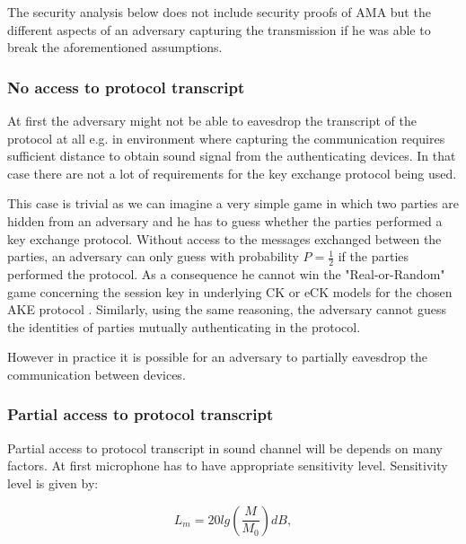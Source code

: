 \documentclass[11pt,titlepage]{article}
\theoremstyle{plain}
\begin{document}
\vspace{5mm}

The security analysis below does not include security proofs of AMA but the different aspects of an adversary capturing the transmission if he was able to break the aforementioned assumptions.

\subsubsection{No access to protocol transcript}
At first the adversary might not be able to eavesdrop the transcript of the protocol at all e.g. in environment where capturing the communication requires sufficient distance to obtain sound signal from the authenticating devices. In that case there are not a lot of requirements for the key exchange protocol being used.

\vspace{5mm}

This case is trivial as we can imagine a very simple game in which two parties are hidden from an adversary and he has to guess whether the parties performed a key exchange protocol. Without access to the messages exchanged between the parties, an adversary can only guess with probability $P = \frac{1}{2}$ if the parties performed the protocol. As a consequence he cannot win the "Real-or-Random" game concerning the session key in underlying CK or eCK models for the chosen AKE protocol \cite{key_exchange, efficient_eck, security_canetti_krawczyk}. Similarly, using the same reasoning, the adversary cannot guess the identities of parties mutually authenticating in the protocol. 

\vspace{5mm}

However in practice it is possible for an adversary to partially eavesdrop the communication between devices.

\subsubsection{Partial access to protocol transcript}

Partial access to protocol transcript in sound channel will be depends on many factors. At first microphone has to have appropriate sensitivity level. Sensitivity level is given by:

\begin{equation}
	L_m = 20 lg(\frac{M}{M_0})dB,
\end{equation}
\end{document}
